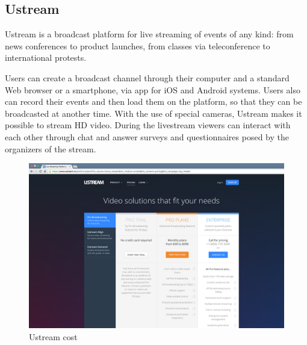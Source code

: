 \subsection{Ustream}
\label{sec:Ustream}
 Ustream is a broadcast platform for live streaming of events of any kind: from news conferences to product launches, from classes via teleconference to international protests.

Users can create a broadcast channel through their computer and a standard Web browser or a smartphone, via app for iOS and Android systems.
Users also can record their events and then load them on the platform, so that they can be broadcasted at another time. With the use of special cameras, Ustream makes it possible to stream HD video.
During the livestream viewers can interact with each other through chat and answer surveys and questionnaires posed by the organizers of the stream.

  
\begin{figure}[!htb]
 \centering
 \includegraphics[width=1.0\linewidth]{images/chapter2/ustream.png}\hfill
 \caption[Ustream cost]{Ustream cost}
 \label{fig:fourV}
\end{figure}